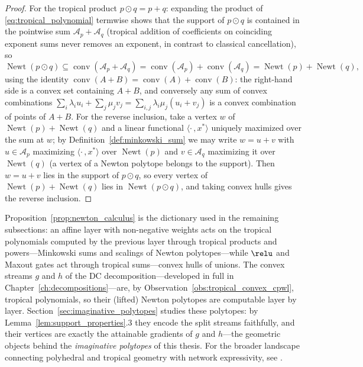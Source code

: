 \begin{proof}
For the tropical product $p \odot q = p + q$: expanding the product of \eqref{eq:tropical_polynomial} termwise shows that the support of $p \odot q$ is contained in the pointwise sum $\mathcal{A}_p + \mathcal{A}_q$ (tropical addition of coefficients on coinciding exponent sums never removes an exponent, in contrast to classical cancellation), so
\begin{equation*}
	\operatorname{Newt}(p \odot q) \subseteq \operatorname{conv}(\mathcal{A}_p + \mathcal{A}_q) = \operatorname{conv}(\mathcal{A}_p) + \operatorname{conv}(\mathcal{A}_q) = \operatorname{Newt}(p) + \operatorname{Newt}(q),
\end{equation*}
using the identity $\operatorname{conv}(A + B) = \operatorname{conv}(A) + \operatorname{conv}(B)$: the right-hand side is a convex set containing $A + B$, and conversely any sum of convex combinations $\sum_i \lambda_i u_i + \sum_j \mu_j v_j = \sum_{i,j} \lambda_i \mu_j (u_i + v_j)$ is a convex combination of points of $A + B$. For the reverse inclusion, take a vertex $w$ of $\operatorname{Newt}(p) + \operatorname{Newt}(q)$ and a linear functional $\langle \cdot\,, x^* \rangle$ uniquely maximized over the sum at $w$; by Definition~\ref{def:minkowski_sum} we may write $w = u + v$ with $u \in \mathcal{A}_p$ maximizing $\langle \cdot\,, x^* \rangle$ over $\operatorname{Newt}(p)$ and $v \in \mathcal{A}_q$ maximizing it over $\operatorname{Newt}(q)$ (a vertex of a Newton polytope belongs to the support). Then $w = u + v$ lies in the support of $p \odot q$, so every vertex of $\operatorname{Newt}(p) + \operatorname{Newt}(q)$ lies in $\operatorname{Newt}(p \odot q)$, and taking convex hulls gives the reverse inclusion.
\end{proof}

\begin{remark}\label{rem:polytope_layer_transitions}
Proposition~\ref{prop:newton_calculus} is the dictionary used in the remaining subsections: an affine layer with non-negative weights acts on the tropical polynomials computed by the previous layer through tropical products and powers---Minkowski sums and scalings of Newton polytopes---while $\relu$ and Maxout gates act through tropical sums---convex hulls of unions. The convex streams $g$ and $h$ of the DC decomposition---developed in full in Chapter~\ref{ch:decompositions}---are, by Observation~\ref{obs:tropical_convex_cpwl}, tropical polynomials, so their (lifted) Newton polytopes are computable layer by layer. Section~\ref{sec:imaginative_polytopes} studies these polytopes: by Lemma~\ref{lem:support_properties}.3 they encode the split streams faithfully, and their vertices are exactly the attainable gradients of $g$ and $h$---the geometric objects behind the \emph{imaginative polytopes} of this thesis. For the broader landscape connecting polyhedral and tropical geometry with network expressivity, see \cite{Zhang2018,Brandenburg2024b,huchette2025deeplearningmeetspolyhedral}.
\end{remark}

